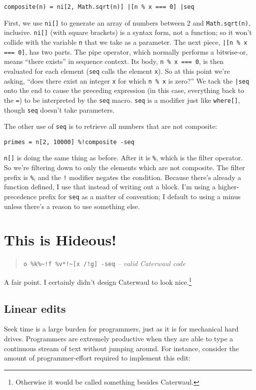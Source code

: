 \documentclass{report}
\begin{document}
\begin{verbatim}
composite(n) = ni[2, Math.sqrt(n)] |[n % x === 0] |seq
\end{verbatim}

    First, we use {\tt ni[]} to generate an array of numbers between 2 and {\tt Math.sqrt(n)}, inclusive. {\tt ni[]} (with square brackets) is a syntax form, not a function; so it won't collide
    with the variable {\tt n} that we take as a parameter. The next piece, \verb+|[n % x === 0]+, has two parts. The pipe operator, which normally performs a bitwise-or, means ``there exists''
    in sequence context. Its body, \verb|n % x === 0|, is then evaluated for each element ({\tt seq} calls the element {\tt x}). So at this point we're asking, ``does there exist an integer
    {\tt x} for which {\tt n \% x} is zero?'' We tack the \verb+|seq+ onto the end to cause the preceding expression (in this case, everything back to the {\tt =}) to be interpreted by the
    {\tt seq} macro. {\tt seq} is a modifier just like {\tt where[]}, though {\tt seq} doesn't take parameters.

    The other use of {\tt seq} is to retrieve all numbers that are not composite:

\begin{verbatim}
primes = n[2, 10000] %!composite -seq
\end{verbatim}

    {\tt n[]} is doing the same thing as before. After it is {\tt \%}, which is the filter operator. So we're filtering down to only the elements which are not composite. The filter prefix is
    \verb|%|, and the \verb|!| modifier negates the condition. Because there's already a function defined, I use that instead of writing out a block. I'm using a higher-precedence prefix for
    {\tt seq} as a matter of convention; I default to using a minus unless there's a reason to use something else.

\chapter{This is Hideous!}\label{sec:this-is-hideous}
\begin{quote}
\verb|o %k%~!f %v*!~[x /!g] -seq|
\hfill \textit{-- valid Caterwaul code}
\end{quote}

  A fair point. I certainly didn't design Caterwaul to look nice.\footnote{Otherwise it would be called something besides Caterwaul.}

\section{Linear edits}
    Seek time is a large burden for programmers, just as it is for mechanical hard drives. Programmers are extremely productive when they are able to type a continuous stream of text without
    jumping around. For instance, consider the amount of programmer-effort required to implement this edit:
\end{document}
